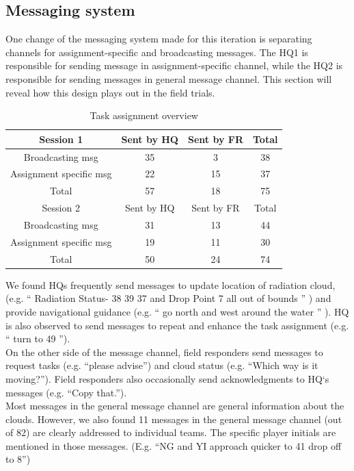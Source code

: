 \subsection{Messaging system}
One change of the messaging system made for this iteration is separating channels for assignment-specific and broadcasting messages. The HQ1 is responsible for sending message in assignment-specific channel, while the HQ2 is responsible for sending messages in general message channel. This section will reveal how this design plays out in the field trials. \\


\begin{table}[h]
\centering
\footnotesize
\begin{tabular}{c|ccc}
Session 1               & Sent by HQ & Sent by FR & Total \\ \hline
Broadcasting msg        & 35         & 3          & 38    \\
Assignment specific msg & 22         & 15         & 37    \\
Total                   & 57         & 18         & 75    \\
Session 2               & Sent by HQ & Sent by FR & Total \\ \hline
Broadcasting msg        & 31         & 13         & 44    \\
Assignment specific msg & 19         & 11         & 30    \\
Total                   & 50         & 24         & 74   
\end{tabular}
\caption{Task assignment overview}
\label{tab:ResultsOverview}
\end{table}

We found HQs frequently send messages to update location of radiation cloud, (e.g. `` Radiation Status- 38  39  37 and Drop Point 7 all out of bounds '' ) and provide navigational guidance (e.g. `` go north  and west around the water '' ). HQ is also observed to send messages to repeat and enhance the task assignment (e.g. `` turn to 49 '').\\

On the other side of the message channel, field responders send messages to request tasks (e.g. ``please advise'') and cloud status (e.g. ``Which way is it moving?''). Field responders also occasionally send acknowledgments to HQ`s messages (e.g. ``Copy that.''). \\

Most messages in the general message channel are general information about the clouds. However, we also found 11 messages in the general message channel (out of 82) are clearly addressed to individual teams. The specific player initials are mentioned in those messages. (E.g. ``NG and YI approach quicker to 41 drop off to 8'')\\

